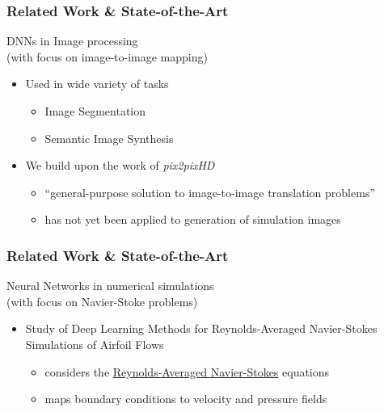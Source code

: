 \documentclass[18pt]{beamer}
\begin{document}
\begin{frame}[t]
  \frametitle{Related Work \& State-of-the-Art}
  DNNs in Image processing\\
  {\footnotesize (with focus on image-to-image mapping)}
  \begin{itemize}
  \item Used in wide variety of tasks
    \begin{itemize}
    \item Image Segmentation
    \item Semantic Image Synthesis
    \end{itemize}
  \item We build upon the work of \textit{pix2pixHD}\footnotemark
    \begin{itemize}
    \item ``general-purpose solution to image-to-image translation problems''
    \item has not yet been applied to generation of simulation images
    \end{itemize}
  \end{itemize}
\end{frame}


\begin{frame}[t]
  \frametitle{Related Work \& State-of-the-Art}  
  Neural Networks in numerical simulations\\
  {\footnotesize (with focus on Navier-Stoke problems)}
  \begin{itemize}

    
    \item Study of Deep Learning Methods for Reynolds-Averaged Navier-Stokes Simulations of Airfoil Flows\footnotemark
    \begin{itemize}
    \item considers the \underline{Reynolds-Averaged Navier-Stokes} equations
    \item maps boundary conditions to velocity and pressure fields
    \end{itemize}
    
  \end{itemize}
\end{frame}
\end{document}

